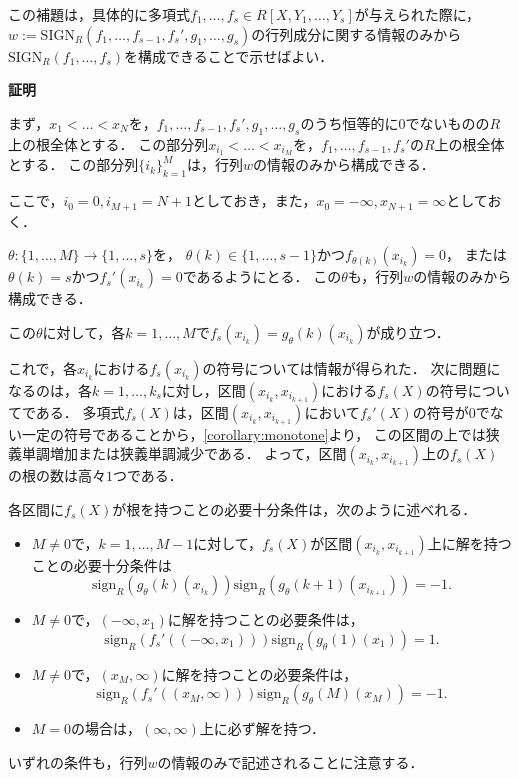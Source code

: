 \documentclass[uplatex, dvipdfmx]{jsarticle}
\makeatletter
\numberwithin{equation}{section}
\renewenvironment{proof}[1][\proofname]{\par
  \pushQED{\qed}%
  \normalfont \topsep6\p@\@plus6\p@\relax
  \trivlist
  \item\relax
  {\bfseries
  #1\@addpunct{.}}\hspace\labelsep\ignorespaces
}{
  \popQED\endtrivlist\@endpefalse
}
\newcommand{\sign}{\mathrm{sign}}
\newcommand{\SIGN}{\mathrm{SIGN}}
\newcommand{\map}[3]{{#1}\colon{#2}\rightarrow{#3}}
\theoremstyle{definition}
\renewcommand{\proofname}{\textbf{証明}}
\makeatother
\begin{document}
この補題は，具体的に多項式$f_1, \dots, f_s \in R[X, Y_1, \dots, Y_s]$が与えられた際に，
$w:=\SIGN_R(f_1, \dots, f_{s-1}, f_s', g_1, \dots, g_s)$の行列成分に関する情報のみから
$\SIGN_R(f_1, \dots, f_s)$を構成できることで示せばよい． 

\begin{proof}
     まず，$x_1 < \dots < x_N$を，$f_1, \dots, f_{s-1}, f_s', g_1, \dots, g_s$のうち恒等的に$0$でないものの$R$上の根全体とする．
     この部分列$x_{i_1} < \dots < x_{i_M}$を，$f_1, \dots, f_{s-1}, f_s'$の$R$上の根全体とする．
     この部分列$\{i_k\}_{k=1}^M$は，行列$w$の情報のみから構成できる．

     ここで，$i_0 = 0, i_{M+1} = N+1$としておき，また，$x_0= -\infty, x_{N+1} = \infty$としておく．

     $\map{\theta}{\{1, \dots, M\}}{\{1, \dots, s\}}$を，
     $\theta(k) \in \{1, \dots, s-1\}$かつ$f_{\theta(k)}(x_{i_k}) = 0$，
     または$\theta(k)=s$かつ$f_{s}'(x_{i_k})=0$であるようにとる．
     この$\theta$も，行列$w$の情報のみから構成できる．

     この$\theta$に対して，各$k=1, \dots, M$で$f_s(x_{i_k}) = g_\theta(k)(x_{i_k})$が成り立つ．

     これで，各$x_{i_k}$における$f_s(x_{i_k})$の符号については情報が得られた．
     次に問題になるのは，各$k=1,\dots, k_s$に対し，区間$(x_{i_k},x_{i_{k+1}})$における$f_s(X)$の符号についてである．
     多項式$f_s(X)$は，区間$(x_{i_k},x_{i_{k+1}})$において$f_s'(X)$の符号が$0$でない一定の符号であることから，\cref{corollary:monotone}より，
     この区間の上では狭義単調増加または狭義単調減少である．
     よって，区間$(x_{i_k},x_{i_{k+1}})$上の$f_s(X)$の根の数は高々$1$つである．

     各区間に$f_s(X)$が根を持つことの必要十分条件は，次のように述べれる．
     \begin{itemize}
          \item $M\neq0$で，$k=1, \dots, M-1$に対して，$f_s(X)$が区間$(x_{i_k}, x_{i_{k+1}})$上に解を持つことの必要十分条件は
          \begin{equation}
               \sign_R(g_\theta(k)(x_{i_k}))\sign_R(g_\theta(k+1)(x_{i_{k+1}})) = -1.
          \end{equation}
          \item $M\neq0$で，$(-\infty, x_1)$に解を持つことの必要条件は，
          \begin{equation}
               \sign_R(f_s'((-\infty, x_1))) \sign_R(g_\theta(1)(x_1)) = 1.
          \end{equation}
          \item $M\neq0$で，$(x_M, \infty)$に解を持つことの必要条件は，
          \begin{equation}
               \sign_R(f_s'((x_M, \infty))) \sign_R(g_\theta(M)(x_M)) = -1.
          \end{equation}
          \item $M = 0$の場合は，$(\infty, \infty)$上に必ず解を持つ．
     \end{itemize}
     いずれの条件も，行列$w$の情報のみで記述されることに注意する．


\end{proof}
\end{document}
